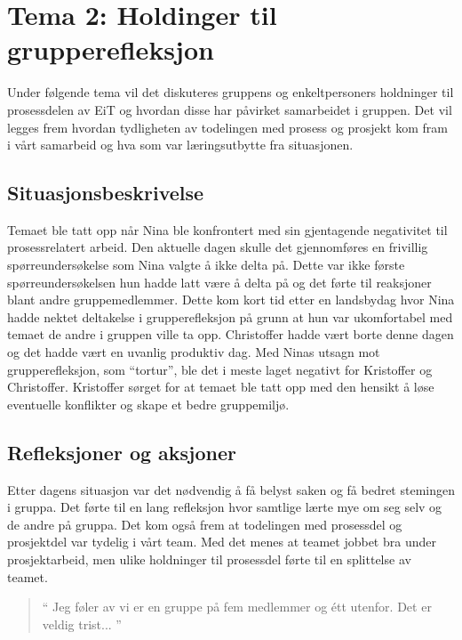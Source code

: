 \chapter{Tema 2: Holdinger til grupperefleksjon}

Under følgende tema vil det diskuteres gruppens og enkeltpersoners holdninger til prosessdelen av EiT og hvordan
disse har påvirket samarbeidet i gruppen. Det vil legges frem hvordan tydligheten av todelingen med prosess og 
prosjekt kom fram i vårt samarbeid og hva som var læringsutbytte fra situasjonen. 

\section{Situasjonsbeskrivelse}

Temaet ble tatt opp når Nina ble konfrontert med sin gjentagende negativitet til prosessrelatert arbeid. Den aktuelle 
dagen skulle det gjennomføres en frivillig spørreundersøkelse som Nina valgte å ikke delta på. Dette var ikke første 
spørreundersøkelsen hun hadde latt være å delta på og det førte til reaksjoner blant andre gruppemedlemmer. 
Dette kom kort tid etter en landsbydag hvor Nina hadde nektet deltakelse i grupperefleksjon på grunn at hun var 
ukomfortabel med temaet de andre i gruppen ville ta opp. Christoffer hadde vært borte denne dagen og det hadde 
vært en uvanlig produktiv dag. Med Ninas utsagn mot grupperefleksjon, som ``tortur'', ble det i meste laget
negativt for Kristoffer og Christoffer. Kristoffer sørget for at temaet ble tatt opp med den hensikt å løse eventuelle
konflikter og skape et bedre gruppemiljø. 

\section{Refleksjoner og aksjoner}

Etter dagens situasjon var det nødvendig å få belyst saken og få bedret stemingen i gruppa. Det førte til en lang
refleksjon hvor samtlige lærte mye om seg selv og de andre på gruppa. Det kom også frem at todelingen med prosessdel
og prosjektdel var tydelig i vårt team. Med det menes at teamet jobbet bra under prosjektarbeid, men ulike holdninger
til prosessdel førte til en splittelse av teamet. 

\begin{quote}``
Jeg føler av vi er en gruppe på fem medlemmer og étt utenfor. Det er veldig trist...
''\end{quote} 


